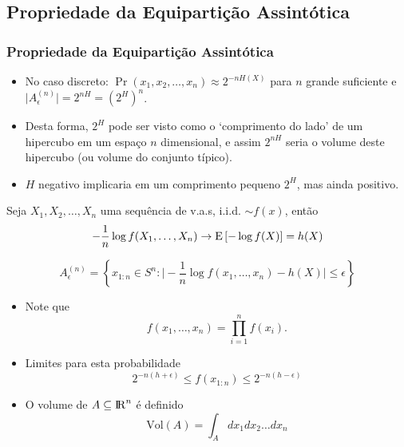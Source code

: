 \subsection{Propriedade da Equipartição Assintótica}
\begin{frame}[allowframebreaks]
  \frametitle{Propriedade da Equipartição Assintótica}
  \begin{itemize}
  \item  No caso discreto: $\Pr(x_1, x_2, \ldots, x_n) \approx 2^{-nH(X)}$ para $n$ grande suficiente
	e $\vert A_{\epsilon}^{(n)} \vert = 2^{nH} = (2^H)^n$.
  \item Desta forma, $2^H$ pode ser visto como o `comprimento do lado' de um hipercubo em um espaço $n$ dimensional,
	e assim $2^{nH}$ seria o volume deste hipercubo (ou volume do conjunto típico).
  \item $H$ negativo implicaria em um comprimento pequeno $2^H$, mas ainda positivo.
  \end{itemize}

  \framebreak

  \begin{theorem}
  Seja $X_1, X_2, \ldots, X_n$ uma sequência de v.a.s, i.i.d. $\sim f(x)$, então
	\begin{equation}
	- \frac{1}{n} \log f(X_1, \ldots, X_n) \rightarrow \mathrm{E} \left[ - \log f(X) \right] = h(X)
	\end{equation}
  \end{theorem}

  \begin{definition}
	\begin{equation}
	A_{\epsilon}^{(n)} = \left\{ x_{1:n} \in S^n : \vert -\frac{1}{n} \log f(x_1, \ldots, x_n) - h(X) \vert \leq \epsilon \right\}
	\end{equation}
  \end{definition}
  \begin{itemize}
  \item Note que 
	\begin{equation}
	f(x_1, \ldots, x_n) = \prod_{i=1}^n f(x_i) .
	\end{equation}
  \item Limites para esta probabilidade
	\begin{equation}
	2^{-n(h + \epsilon)} \leq f(x_{1:n}) \leq 2^{-n(h - \epsilon)}
	\end{equation}
  \item O volume de $A \subseteq {\rm I\!R}^n$ é definido
	\begin{equation}
	\text{Vol}(A) = \int_A dx_1 dx_2 \ldots dx_n
	\end{equation}
  \end{itemize}


\end{frame}
